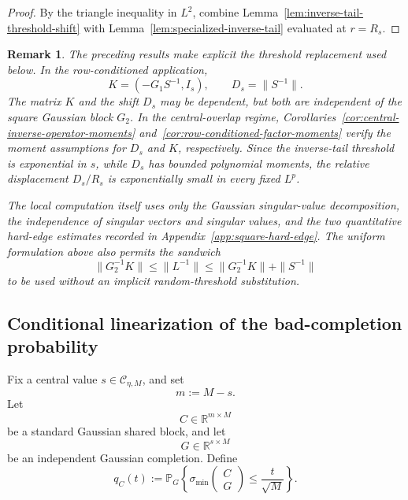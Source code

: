 \documentclass[11pt]{article}
\newtheorem{remark}{Remark}
\newcommand{\R}{\mathbb R}
\newcommand{\Pbb}{\mathbb P}
\newcommand{\1}{\mathbf 1}
\newcommand{\smin}{\sigma_{\min}}
\begin{document}
\begin{proof}
By the triangle inequality in \(L^2\), combine
Lemma~\ref{lem:inverse-tail-threshold-shift} with
Lemma~\ref{lem:specialized-inverse-tail} evaluated at \(r=R_s\).
\end{proof}

\begin{remark}
The preceding results make explicit the threshold replacement used below.  In the
row-conditioned application,
\[
        K=(-G_1S^{-1},I_s),
        \qquad
        D_s=\|S^{-1}\|.
\]
The matrix \(K\) and the shift \(D_s\) may be dependent, but both are independent of the
square Gaussian block \(G_2\).  In the central-overlap regime,
Corollaries~\ref{cor:central-inverse-operator-moments}
and~\ref{cor:row-conditioned-factor-moments} verify the moment assumptions
for \(D_s\) and \(K\), respectively.  Since the inverse-tail threshold is exponential
in \(s\), while \(D_s\) has bounded polynomial moments, the relative displacement
\(D_s/R_s\) is exponentially small in every fixed \(L^p\).

The local computation itself uses only the Gaussian singular-value decomposition, the
independence of singular vectors and singular values, and the two quantitative hard-edge
estimates recorded in Appendix~\ref{app:square-hard-edge}.  The uniform formulation above
also permits the sandwich
\[
        \|G_2^{-1}K\|
        \le
        \|L^{-1}\|
        \le
        \|G_2^{-1}K\|+\|S^{-1}\|
\]
to be used without an implicit random-threshold substitution.
\end{remark}

\subsection{Conditional linearization of the bad-completion probability}

Fix a central value \(s\in\mathcal C_{\eta,M}\), and set
\[
        m:=M-s.
\]
Let
\[
        C\in\R^{m\times M}
\]
be a standard Gaussian shared block, and let
\[
        G\in\R^{s\times M}
\]
be an independent Gaussian completion.  Define
\[
        q_C(t):=
        \Pbb_G\left\{
        \smin\begin{pmatrix}C\\G\end{pmatrix}
        \le \frac{t}{\sqrt M}
        \right\}.
\]
\end{document}
